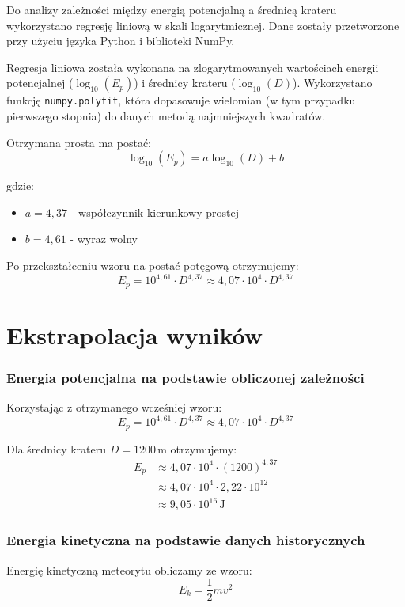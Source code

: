 \documentclass[a4paper,12pt]{article}
\begin{document}
Do analizy zależności między energią potencjalną a średnicą krateru wykorzystano regresję liniową w skali logarytmicznej. Dane zostały przetworzone przy użyciu języka Python i biblioteki NumPy.

Regresja liniowa została wykonana na zlogarytmowanych wartościach energii potencjalnej ($\log_{10}(E_p)$) i średnicy krateru ($\log_{10}(D)$). Wykorzystano funkcję \texttt{numpy.polyfit}, która dopasowuje wielomian (w tym przypadku pierwszego stopnia) do danych metodą najmniejszych kwadratów.


Otrzymana prosta ma postać:
\[ \log_{10}(E_p) = a\log_{10}(D) + b \]

gdzie:
\begin{itemize}
    \item $a = 4,37$ - współczynnik kierunkowy prostej
    \item $b = 4,61$ - wyraz wolny
\end{itemize}

Po przekształceniu wzoru na postać potęgową otrzymujemy:
\[ E_p = 10^{4,61} \cdot D^{4,37} \approx 4,07 \cdot 10^4 \cdot D^{4,37} \]
\section{Ekstrapolacja wyników}

\subsubsection{Energia potencjalna na podstawie obliczonej zależności}

Korzystając z otrzymanego wcześniej wzoru:
\[
E_p = 10^{4,61} \cdot D^{4,37} \approx 4,07 \cdot 10^4 \cdot D^{4,37}
\]

Dla średnicy krateru \( D = 1200 \, \text{m} \) otrzymujemy:
\begin{align*}
E_p &\approx 4,07 \cdot 10^4 \cdot (1200)^{4,37} \\
&\approx 4,07 \cdot 10^4 \cdot 2,22 \cdot 10^{12} \\
&\approx 9,05 \cdot 10^{16} \, \text{J}
\end{align*}

\subsubsection{Energia kinetyczna na podstawie danych historycznych}

Energię kinetyczną meteorytu obliczamy ze wzoru:
\[
E_k = \frac{1}{2} m v^2
\]
\end{document}

